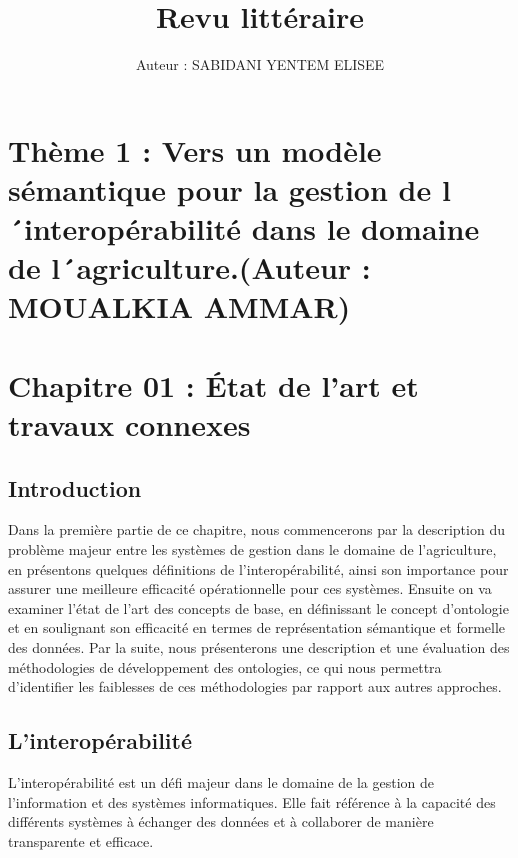 \documentclass{article}
\title{Revu littéraire}
\author{Auteur : SABIDANI YENTEM ELISEE}
\begin{document}
	\maketitle
	
	\newpage
	\tableofcontents
	\newpage

	\section{Thème 1 : Vers un modèle sémantique pour la gestion de l´interopérabilité dans le domaine de l´agriculture.(Auteur : MOUALKIA AMMAR)}
	
	\section{Chapitre 01 : État de l'art et travaux connexes}
	
	\subsection{Introduction}
	Dans la première partie de ce chapitre, nous commencerons par la description du
	problème majeur entre les systèmes de gestion dans le domaine de l’agriculture, en présentons
	quelques définitions de l’interopérabilité, ainsi son importance pour assurer une meilleure
	efficacité opérationnelle pour ces systèmes. Ensuite on va examiner l'état de l'art des concepts
	de base, en définissant le concept d'ontologie et en soulignant son efficacité en termes de
	représentation sémantique et formelle des données. Par la suite, nous présenterons une
	description et une évaluation des méthodologies de développement des ontologies, ce qui nous
	permettra d'identifier les faiblesses de ces méthodologies par rapport aux autres approches.
	
	\subsection{L’interopérabilité}
	L'interopérabilité est un défi majeur dans le domaine de la gestion de l'information et
	des systèmes informatiques. Elle fait référence à la capacité des différents systèmes à échanger
	des données et à collaborer de manière transparente et efficace.
	
\end{document}
